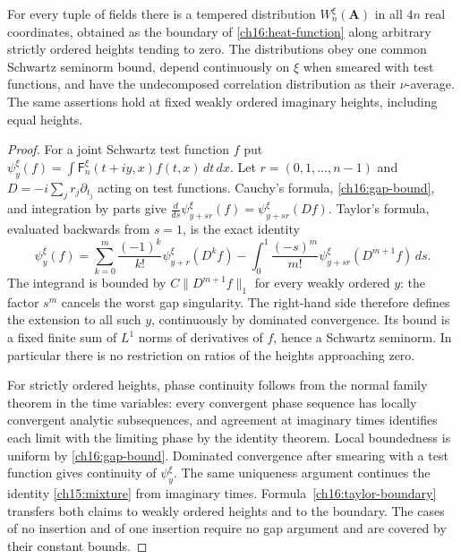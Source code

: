 \begin{proposition}
\label{ch16:boundary}
For every tuple of fields there is a tempered distribution
$W_n^\xi(\boldsymbol A)$ in all $4n$ real coordinates, obtained as the
boundary of \eqref{ch16:heat-function} along arbitrary strictly ordered
heights tending to zero. The distributions obey one common Schwartz
seminorm bound, depend continuously on $\xi$ when smeared with test functions, and have the
undecomposed correlation distribution as their $\nu$-average. The same assertions
hold at fixed weakly ordered imaginary heights, including equal heights.
\end{proposition}
\begin{proof}
For a joint Schwartz test function $f$ put
$\psi_y^\xi(f)=\int\mathsf F_n^\xi(t+iy,x)f(t,x)\,dt\,dx$.
Let $r=(0,1,\ldots,n-1)$ and $D=-i\sum_jr_j\partial_{t_j}$ acting on test functions.
Cauchy's formula, \eqref{ch16:gap-bound}, and integration by parts give
$\frac d{ds}\psi_{y+sr}^\xi(f)=\psi_{y+sr}^\xi(Df)$.
Taylor's formula, evaluated backwards from $s=1$, is the exact identity
\begin{equation}
 \psi_y^\xi(f)=
 \sum_{k=0}^m\frac{(-1)^k}{k!}\psi_{y+r}^\xi(D^kf)
 -\int_0^1\frac{(-s)^m}{m!}
                   \psi_{y+sr}^\xi(D^{m+1}f)\,ds.
 \label{ch16:taylor-boundary}
\end{equation}
The integrand is bounded by $C\|D^{m+1}f\|_1$ for every weakly ordered
$y$: the factor $s^m$ cancels the worst gap singularity. The right-hand
side therefore defines the extension to all such $y$, continuously by
dominated convergence. Its bound is a fixed finite sum of $L^1$ norms
of derivatives of $f$, hence a Schwartz seminorm. In particular there
is no restriction on ratios of the heights approaching zero.

For strictly ordered heights, phase continuity follows from the normal
family theorem in the time variables: every convergent phase sequence
has locally convergent analytic subsequences, and agreement at imaginary
times identifies each limit with the limiting phase by the identity
theorem. Local boundedness is uniform by \eqref{ch16:gap-bound}.
Dominated convergence after smearing with a test function gives continuity of $\psi_y^\xi$.
The same uniqueness argument continues the identity \eqref{ch15:mixture} from
imaginary times. Formula~\eqref{ch16:taylor-boundary} transfers both
claims to weakly ordered heights and to the boundary. The cases of no insertion and of one insertion
require no gap argument and are covered by their constant bounds.
\end{proof}

